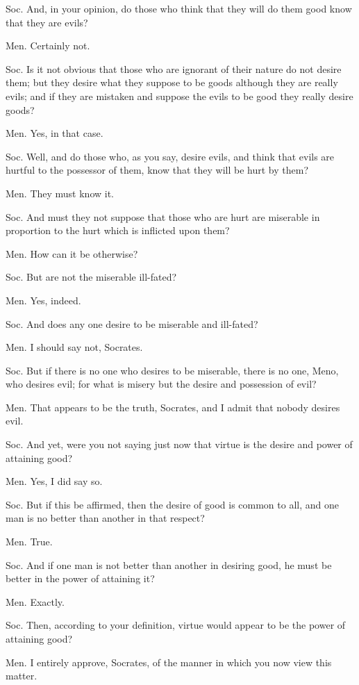Soc. And, in your opinion, do those who think that they will do them
good know that they are evils? 

Men. Certainly not. 

Soc. Is it not obvious that those who are ignorant of their nature
do not desire them; but they desire what they suppose to be goods
although they are really evils; and if they are mistaken and suppose
the evils to be good they really desire goods? 

Men. Yes, in that case. 

Soc. Well, and do those who, as you say, desire evils, and think that
evils are hurtful to the possessor of them, know that they will be
hurt by them? 

Men. They must know it. 

Soc. And must they not suppose that those who are hurt are miserable
in proportion to the hurt which is inflicted upon them? 

Men. How can it be otherwise? 

Soc. But are not the miserable ill-fated? 

Men. Yes, indeed. 

Soc. And does any one desire to be miserable and ill-fated?

Men. I should say not, Socrates. 

Soc. But if there is no one who desires to be miserable, there is
no one, Meno, who desires evil; for what is misery but the desire
and possession of evil? 

Men. That appears to be the truth, Socrates, and I admit that nobody
desires evil. 

Soc. And yet, were you not saying just now that virtue is the desire
and power of attaining good? 

Men. Yes, I did say so. 

Soc. But if this be affirmed, then the desire of good is common to
all, and one man is no better than another in that respect?

Men. True. 

Soc. And if one man is not better than another in desiring good, he
must be better in the power of attaining it? 

Men. Exactly. 

Soc. Then, according to your definition, virtue would appear to be
the power of attaining good? 

Men. I entirely approve, Socrates, of the manner in which you now
view this matter. 

